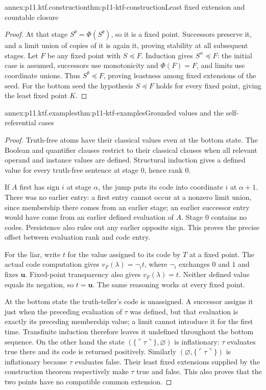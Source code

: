 \begin{annexitem}{annex:p11.ktf.construction}{thm:p11-ktf-construction}{Least fixed extension and countable closure}
\begin{proof}
At that stage \(S^\theta=\Phi(S^\theta)\), so it is a fixed
point. Successors preserve it, and a limit union of copies of it is again
it, proving stability at all subsequent stages. Let \(F\) be any
fixed point with \(S\preceq F\). Induction gives
\(S^\alpha\preceq F\): the initial case is assumed, successors
use monotonicity and \(\Phi(F)=F\), and limits use coordinate unions.
Thus \(S^\theta\preceq F\), proving leastness among fixed extensions
of the seed. For the bottom seed the hypothesis \(S\preceq F\)
holds for every fixed point, giving the least fixed point \(K\).
\end{proof}
\end{annexitem}

\begin{annexitem}{annex:p11.ktf.examples}{thm:p11-ktf-examples}{Grounded values and the self-referential cases}
\begin{proof}
Truth-free atoms have their classical values even at the bottom state.
The Boolean and quantifier clauses restrict to their classical clauses
when all relevant operand and instance values are defined. Structural
induction gives a defined value for every truth-free sentence at stage
\(0\), hence rank \(0\).

If \(A\) first has sign \(i\) at stage \(\alpha\), the jump puts
its code into coordinate \(i\) at \(\alpha+1\). There was no
earlier entry: a first entry cannot occur at a nonzero limit union, since
membership there comes from an earlier stage; an earlier successor entry
would have come from an earlier defined evaluation of \(A\). Stage
\(0\) contains no codes. Persistence also rules out any earlier
opposite sign. This proves the precise offset between evaluation rank
and code entry.

For the liar, write \(t\) for the value assigned to its code by \(T\)
at a fixed point. The actual code computation gives
\(v_F(\lambda)=\neg_i t\), where \(\neg_i\) exchanges \(0\)
and \(1\) and fixes \(\mathbf u\). Fixed-point transparency also
gives \(v_F(\lambda)=t\). Neither defined value equals its negation,
so \(t=\mathbf u\). The same reasoning works at every fixed point.

At the bottom state the truth-teller's code is unassigned. A successor
assigns it just when the preceding evaluation of \(\tau\) was defined,
but that evaluation is exactly its preceding membership value; a limit
cannot introduce it for the first time. Transfinite induction therefore
leaves it undefined throughout the bottom sequence.
On the other hand the state
\((\{\ulcorner\tau\urcorner\},\varnothing)\) is inflationary:
\(\tau\) evaluates true there and its code is returned positively.
Similarly \((\varnothing,\{\ulcorner\tau\urcorner\})\) is
inflationary because \(\tau\) evaluates false. Their least fixed
extensions supplied by the construction theorem respectively make
\(\tau\) true and false. This also proves that the two points have
no compatible common extension.


\end{proof}
\end{annexitem}
